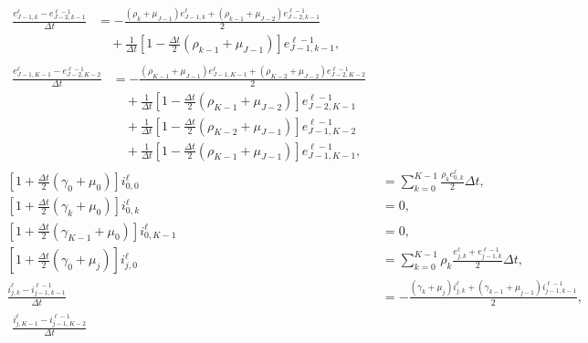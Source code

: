 \documentclass[USenglish]{article}
\begin{document}
\begin{subequations}
\begin{align}
    \\
    \begin{split}
      \frac{e_{J - 1, k}^{\ell} - e_{J - 2, k - 1}^{\ell - 1}}{\Delta t}
      &= - \frac{(\rho_k + \mu_{J - 1}) e_{J - 1, k}^{\ell}
        + (\rho_{k - 1} + \mu_{J - 2}) e_{J - 2, k - 1}^{\ell - 1}}
      {2}
      \\ & \quad {}
      + \frac{1}{\Delta t} \left[
        1 - \frac{\Delta t}{2} (\rho_{k - 1} + \mu_{J - 1})
      \right] e_{J - 1, k - 1}^{\ell - 1},
    \end{split}
    \\
    \begin{split}
      \frac{e_{J - 1, K - 1}^{\ell} - e_{J - 2, K - 2}^{\ell - 1}}{\Delta t}
      &= - \frac{(\rho_{K - 1} + \mu_{J - 1}) e_{J - 1, K - 1}^{\ell}
        + (\rho_{K - 2} + \mu_{J - 2}) e_{J - 2, K - 2}^{\ell - 1}}
      {2}
      \\ & \quad {}
      + \frac{1}{\Delta t} \left[
        1 - \frac{\Delta t}{2} (\rho_{K - 1} + \mu_{J - 2})
      \right] e_{J - 2, K - 1}^{\ell - 1}
      \\ & \quad {}
      + \frac{1}{\Delta t} \left[
        1 - \frac{\Delta t}{2} (\rho_{K - 2} + \mu_{J - 1})
      \right] e_{J - 1, K - 2}^{\ell - 1}
      \\ & \quad {}
      + \frac{1}{\Delta t} \left[
        1 - \frac{\Delta t}{2} (\rho_{K - 1} + \mu_{J - 1})
      \right] e_{J - 1, K - 1}^{\ell - 1},
    \end{split}
    \\
    \left[1 + \frac{\Delta t}{2} (\gamma_0 + \mu_0)\right] i_{0, 0}^{\ell}
    &= \sum_{k = 0}^{K - 1} \frac{\rho_k e_{0, k}^{\ell}} {2}
    \Delta t,
    \\
    \left[1 + \frac{\Delta t}{2} (\gamma_k + \mu_0)\right] i_{0, k}^{\ell}
    &= 0,
    \\
    \left[1 + \frac{\Delta t}{2} (\gamma_{K - 1} + \mu_0)\right]
    i_{0, K - 1}^{\ell}
    &= 0,
    \\
    \left[1 + \frac{\Delta t}{2} (\gamma_0 + \mu_j)\right] i_{j, 0}^{\ell}
    &= \sum_{k = 0}^{K - 1} \rho_k
    \frac{e_{j, k}^{\ell} + e_{j - 1, k}^{\ell - 1}} {2}
    \Delta t,
    \\
    \frac{i_{j, k}^{\ell} - i_{j - 1, k - 1}^{\ell - 1}}{\Delta t}
    &= - \frac{(\gamma_k + \mu_j) i_{j, k}^{\ell}
      + (\gamma_{k - 1} + \mu_{j - 1}) i_{j - 1, k - 1}^{\ell - 1}}
    {2},
    \\
    \begin{split}
      \frac{i_{j, K - 1}^{\ell} - i_{j - 1, K - 2}^{\ell - 1}}{\Delta t}

\end{split}
\end{align}
\end{subequations}
\end{document}
